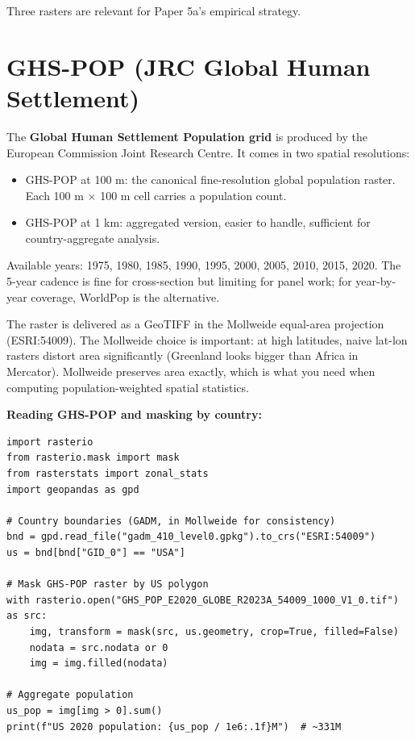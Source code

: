 \documentclass[11pt,letterpaper,oneside]{book}
\theoremstyle{definition}
\theoremstyle{remark}
\begin{document}
Three rasters are relevant for Paper 5a's empirical strategy.

\section{GHS-POP (JRC Global Human Settlement)}

The \textbf{Global Human Settlement Population grid} is produced by the
European Commission Joint Research Centre. It comes in two
spatial resolutions:
\begin{itemize}
  \item GHS-POP at 100 m: the canonical fine-resolution global
    population raster. Each 100 m $\times$ 100 m cell carries a
    population count.
  \item GHS-POP at 1 km: aggregated version, easier to handle, sufficient
    for country-aggregate analysis.
\end{itemize}

Available years: 1975, 1980, 1985, 1990, 1995, 2000, 2005, 2010, 2015,
2020. The 5-year cadence is fine for cross-section but limiting for
panel work; for year-by-year coverage, WorldPop is the alternative.

The raster is delivered as a GeoTIFF in the Mollweide equal-area
projection (ESRI:54009). The Mollweide choice is important: at
high latitudes, naive lat-lon rasters distort area significantly
(Greenland looks bigger than Africa in Mercator). Mollweide preserves
area exactly, which is what you need when computing population-weighted
spatial statistics.

\begin{worked}
\textbf{Reading GHS-POP and masking by country:}
\begin{lstlisting}
import rasterio
from rasterio.mask import mask
from rasterstats import zonal_stats
import geopandas as gpd

# Country boundaries (GADM, in Mollweide for consistency)
bnd = gpd.read_file("gadm_410_level0.gpkg").to_crs("ESRI:54009")
us = bnd[bnd["GID_0"] == "USA"]

# Mask GHS-POP raster by US polygon
with rasterio.open("GHS_POP_E2020_GLOBE_R2023A_54009_1000_V1_0.tif") as src:
    img, transform = mask(src, us.geometry, crop=True, filled=False)
    nodata = src.nodata or 0
    img = img.filled(nodata)

# Aggregate population
us_pop = img[img > 0].sum()
print(f"US 2020 population: {us_pop / 1e6:.1f}M")  # ~331M
\end{lstlisting}
\end{worked}
\end{document}
